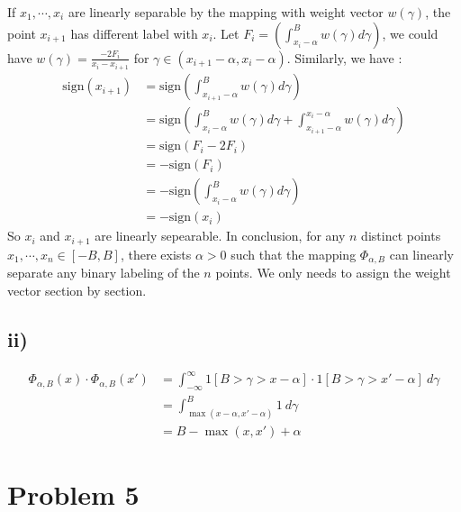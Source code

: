 \documentclass[twoside,11pt]{homework}
\begin{document}
If $x_1, \cdots, x_i$ are linearly separable by the mapping with weight vector $w(\gamma)$, the point $x_{i+1}$ has different label with $x_i$. 
Let $F_i = (\int_{x_i - \alpha}^B w(\gamma) d\gamma)$, we could have $w(\gamma)  = \frac{-2F_i}{x_i - x_{i+1}}$ for $\gamma \in (x_{i+1} - \alpha, x_i - \alpha)$.
Similarly, we have :
%
\begin{equation}
\begin{split}
\mathrm{sign} (x_{i+1}) &= \mathrm{sign}(\int_{x_{i+1} - \alpha}^B w(\gamma) d\gamma) \\
&= \mathrm{sign}(\int_{x_i - \alpha}^B w(\gamma) d\gamma + \int_{x_{i+1} - \alpha}^{x_i - \alpha} w(\gamma) d\gamma) \\
&= \mathrm{sign}(F_i - 2F_i) \\
&= - \mathrm{sign} (F_i) \\
&= - \mathrm{sign}(\int_{x_i - \alpha}^B w(\gamma) d\gamma) \\
&= - \mathrm{sign}(x_i)
\end{split}
\end{equation}
%
So $x_i$ and $x_{i+1}$ are linearly sepearable.
In conclusion, for any $n$ distinct points $x_1, \cdots, x_n \in [-B, B]$, there exists $\alpha >0 $ such that the mapping $\Phi_{\alpha, B}$ can linearly separate any binary labeling of the $n$ points. 
We only needs to assign the weight vector section by section.


\subsection*{ii)}
%
\begin{equation}
\begin{split}
\Phi_{\alpha, B} (x) \cdot \Phi_{\alpha, B} (x') &= \int_{-\infty}^{\infty} 1[B > \gamma > x-\alpha] \cdot 1[B > \gamma > x'-\alpha]\ d\gamma \\
&= \int_{\max(x - \alpha, x' - \alpha)}^B 1\ d\gamma \\
&= B - \max(x, x') + \alpha
\end{split}
\end{equation}
%

\section*{Problem 5}
\end{document}
